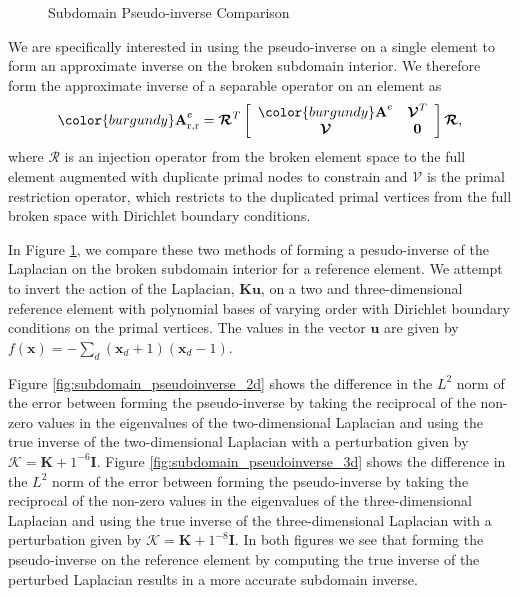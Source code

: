 \begin{figure}[!ht]
  \centering
  \hfill
  \caption{Subdomain Pseudo-inverse Comparison}
  \label{fig:subdomain_pseudoinverse}
\end{figure}

We are specifically interested in using the pseudo-inverse on a single element to form an approximate inverse on the broken subdomain interior.
We therefore form the approximate inverse of a separable operator on an element as
\begin{equation}
  {\color{burgundy}\mathbf{A}}^e_{\text{r}, \text{r}} = \boldsymbol{\mathcal{R}}^T
  \left[ \begin{array}{c c}
  {\color{burgundy}\mathbf{A}}^e  &  \boldsymbol{\mathcal{V}}^T  \\
  \boldsymbol{\mathcal{V}}        &  \mathbf{0}                  \\
  \end{array} \right]
  \boldsymbol{\mathcal{R}},
  \label{eq:saddle-point}
\end{equation}
where $\boldsymbol{\mathcal{R}}$ is an injection operator from the broken element space to the full element augmented with duplicate primal nodes to constrain and $\boldsymbol{\mathcal{V}}$ is the primal restriction operator, which restricts to the duplicated primal vertices from the full broken space with Dirichlet boundary conditions.

In Figure \ref{fig:subdomain_pseudoinverse}, we compare these two methods of forming a pesudo-inverse of the Laplacian on the broken subdomain interior for a reference element.
We attempt to invert the action of the Laplacian, $\mathbf{K} \mathbf{u}$, on a two and three-dimensional reference element with polynomial bases of varying order with Dirichlet boundary conditions on the primal vertices.
The values in the vector $\mathbf{u}$ are given by $f \left( \mathbf{x} \right) = - \sum_d \left( \mathbf{x}_d + 1 \right) \left( \mathbf{x}_d - 1 \right)$.

Figure \ref{fig:subdomain_pseudoinverse_2d} shows the difference in the $L^2$ norm of the error between forming the pseudo-inverse by taking the reciprocal of the non-zero values in the eigenvalues of the two-dimensional Laplacian and using the true inverse of the two-dimensional Laplacian with a perturbation given by $\boldsymbol{\mathcal{K}} = \mathbf{K} + 1^{-6} \mathbf{I}$.
Figure \ref{fig:subdomain_pseudoinverse_3d} shows the difference in the $L^2$ norm of the error between forming the pseudo-inverse by taking the reciprocal of the non-zero values in the eigenvalues of the three-dimensional Laplacian and using the true inverse of the three-dimensional Laplacian with a perturbation given by $\boldsymbol{\mathcal{K}} = \mathbf{K} + 1^{-8} \mathbf{I}$.
In both figures we see that forming the pseudo-inverse on the reference element by computing the true inverse of the perturbed Laplacian results in a more accurate subdomain inverse.

